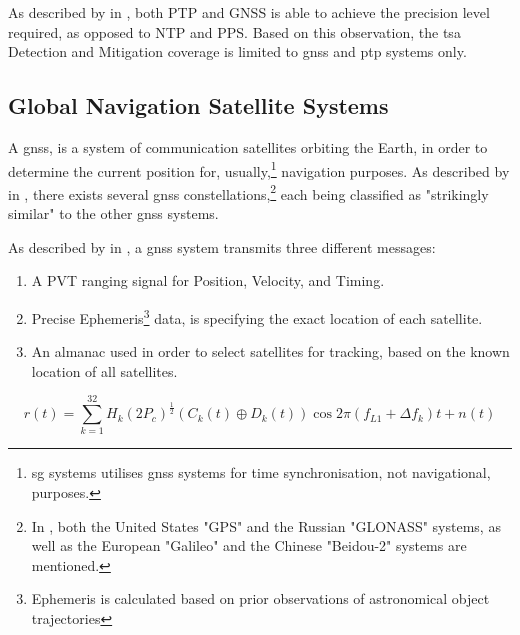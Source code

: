 As described by \citeauthor{moussa2016security} in \cite{moussa2016security}, both PTP and GNSS is able to achieve the precision level required, as opposed to NTP and PPS.  Based on this observation, the \acrshort{tsa} Detection and Mitigation coverage is limited to \acrshort{gnss} and  \acrshort{ptp} systems only.




\subsection{Global Navigation Satellite Systems}

A \acrfull{gnss}, is a system of communication satellites orbiting the Earth, in order to determine the current position for, usually,\footnote{\acrlong{sg} systems utilises \acrshort{gnss} systems for time synchronisation, not navigational, purposes.} navigation  purposes. As described by \citeauthor{schmidt2016survey} in \cite{schmidt2016survey}, there exists several \acrshort{gnss} constellations,\footnote{In \cite{schmidt2016survey}, both the United States "GPS" and the Russian "GLONASS" systems, as well as the European "Galileo" and the Chinese "Beidou-2" systems are mentioned.} each being classified as "strikingly similar" to the other \acrshort{gnss} systems. 








As described by \citeauthor{schmidt2016survey} in  \cite{schmidt2016survey},  a \acrshort{gnss} system transmits three different messages:

\begin{enumerate}
    \item A PVT ranging signal for Position, Velocity, and Timing.
    \item Precise Ephemeris\footnote{Ephemeris is calculated based on prior observations of astronomical object trajectories} data, is specifying the exact location of each satellite.
    \item An almanac used in order to select satellites for tracking, based on the known location of all satellites. 
    
\end{enumerate}

$$r(t)=\sum_{k=1}^{32}H_{k}(2P_{c})^{\frac{1}{2}}(C_{k}(t)\oplus D_{k}(t))\cos{2\pi}(f_{L1}+\Delta f_{k})t+n(t) $$


